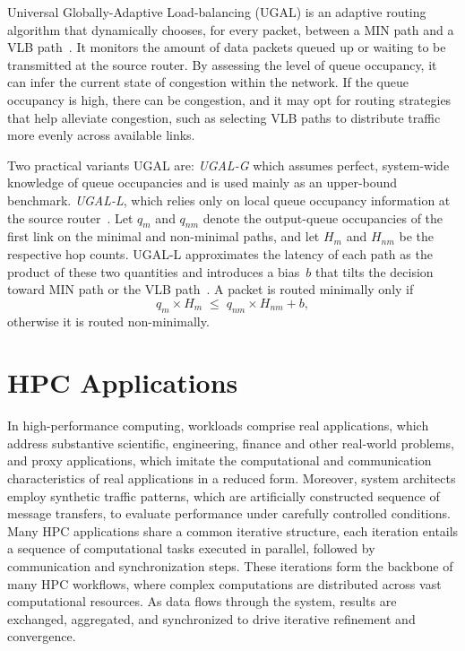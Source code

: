 Universal Globally-Adaptive Load-balancing (UGAL) is an adaptive routing algorithm that dynamically chooses, for every packet,
between a MIN path and a VLB path~\cite{kim2008technology}. It monitors the amount of data packets queued up or waiting to be transmitted at the source router. By assessing the level of queue occupancy, it can infer the current state of congestion within the network. If the queue occupancy is high, there can be congestion, and it may opt for routing strategies that help alleviate congestion, such as selecting VLB paths to distribute traffic more evenly across available links. 

Two practical variants UGAL are:
\emph{UGAL-G} which assumes perfect, system-wide knowledge of queue occupancies and is
used mainly as an upper-bound benchmark.
\emph{UGAL-L}, which relies only on local queue occupancy information at the source
router~\cite{kim2008technology}.  
Let $q_m$ and $q_{nm}$ denote the output-queue occupancies of the first link on
the minimal and non-minimal paths, and let $H_m$ and $H_{nm}$ be the respective
hop counts.  
UGAL-L approximates the latency of each path as the product of these two
quantities and introduces a bias~$b$ that tilts the decision toward MIN path or
the VLB path~\cite{kim2008technology}.  
A packet is routed minimally only if
\[
  q_m \times H_m \;\le\; q_{nm} \times H_{nm} + b,
\]
otherwise it is routed non-minimally.  



\section{HPC Applications}
\label{sec:exp}
In high-performance computing, workloads comprise real applications, which address substantive scientific, engineering, finance and other real-world problems, and proxy applications, which imitate the computational and communication characteristics of real applications in a reduced form. Moreover, system architects employ synthetic traffic patterns, which are artificially constructed sequence of message transfers, to evaluate performance under carefully controlled conditions.
Many HPC applications share a common iterative structure, each iteration entails a sequence of computational tasks executed in parallel, followed by communication and synchronization steps. These iterations form the backbone of many HPC workflows, where complex computations are distributed across vast computational resources. As data flows through the system, results are exchanged, aggregated, and synchronized to drive iterative refinement and convergence.

